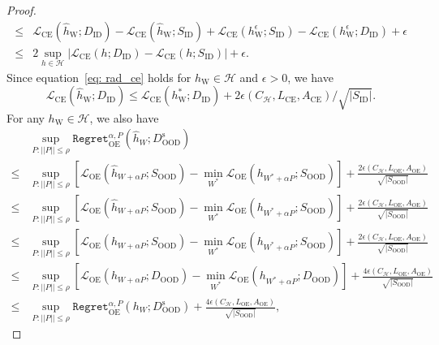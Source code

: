 \documentclass{article} \usepackage{iclr2022_conference,times}
\def\eqref#1{equation~\ref{#1}}
\begin{document}
\begin{proof}
\begin{align}
    \le & {\mathcal{L}}_\text{CE}(\hat{h}_\text{W}; D_\text{ID}) - {\mathcal{L}}_\text{CE}(\hat{h}_\text{W}; S_\text{ID}) + {\mathcal{L}}_\text{CE}({h}^\epsilon_\text{W}; S_\text{ID}) - {\mathcal{L}}_\text{CE}({h}^\epsilon_\text{W}; D_\text{ID}) + \epsilon \\
    \le & 2 \sup_{h\in\mathcal{H}} \lvert{\mathcal{L}}_\text{CE}(h; D_\text{ID}) - {\mathcal{L}}_\text{CE}(h; S_\text{ID})\rvert + \epsilon.
\end{align}
Since \eqref{eq: rad_ce} holds for $h_\text{W}\in\mathcal{H}$ and $\epsilon > 0$, we have 
\begin{equation}
    {\mathcal{L}}_\text{CE}(\hat{h}_\text{W}; D_\text{ID}) \le {\mathcal{L}}_\text{CE}({h}^*_\text{W}; D_\text{ID}) + 2 \epsilon(C_\mathcal{H}, L_\text{CE}, A_\text{CE})/\sqrt{\lvert S_\text{ID} \rvert}. \label{eq: theorem2_c1} 
\end{equation}
For any $h_\text{W}\in\mathcal{H}$, we also have 
\begin{align}
    & \sup_{P: \lvert\lvert  P\rvert\rvert \le \rho}  {\texttt{Regret}}_{\text{OE}}^{\alpha, P}(\hat{h}_{W}; D^\text{s}_\text{OOD})  \nonumber \\
    \le & \sup_{P: \lvert\lvert  P\rvert\rvert \le \rho}\left[ \mathcal{L}_\text{OE}(\hat{h}_{W+ \alpha P}; S_\text{OOD}) - \min_{W^*} \mathcal{L}_\text{OE}(h_{W^* + \alpha P}; S_\text{OOD}) \right] + \frac{2 \epsilon(C_\mathcal{H}, L_\text{OE}, A_\text{OE})}{\sqrt{\lvert S_\text{OOD} \rvert}}  \\
    \le & \sup_{P: \lvert\lvert  P\rvert\rvert \le \rho}\left[ \mathcal{L}_\text{OE}(\hat{h}_{W+ \alpha P}; S_\text{OOD}) - \min_{W^*} \mathcal{L}_\text{OE}(h_{W^* + \alpha P}; S_\text{OOD}) \right] + \frac{2 \epsilon(C_\mathcal{H}, L_\text{OE}, A_\text{OE})}{\sqrt{\lvert S_\text{OOD} \rvert}} \\
    \le & \sup_{P: \lvert\lvert  P\rvert\rvert \le \rho}\left[ \mathcal{L}_\text{OE}({h}_{W+ \alpha P}; S_\text{OOD}) - \min_{W^*} \mathcal{L}_\text{OE}(h_{W^* + \alpha P}; S_\text{OOD}) \right] + \frac{2 \epsilon(C_\mathcal{H}, L_\text{OE}, A_\text{OE})}{\sqrt{\lvert S_\text{OOD} \rvert}}  \\
    \le & \sup_{P: \lvert\lvert  P\rvert\rvert \le \rho}\left[ \mathcal{L}_\text{OE}({h}_{W+ \alpha P}; D_\text{OOD}) - \min_{W^*} \mathcal{L}_\text{OE}(h_{W^* + \alpha P}; D_\text{OOD}) \right] + \frac{4 \epsilon(C_\mathcal{H}, L_\text{OE}, A_\text{OE})}{\sqrt{\lvert S_\text{OOD} \rvert}}  \\
    \le & \sup_{P: \lvert\lvert  P\rvert\rvert \le \rho} {\texttt{Regret}}_{\text{OE}}^{\alpha, P}({h}_{W}; D^\text{s}_\text{OOD})  + \frac{4 \epsilon(C_\mathcal{H}, L_\text{OE}, A_\text{OE})}{\sqrt{\lvert S_\text{OOD} \rvert}},

\end{align}
\end{proof}
\end{document}
